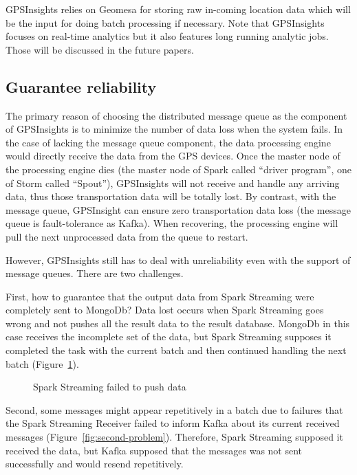 \documentclass{sig-alternate-05-2015}
\begin{document}
GPSInsights relies on Geomesa for storing raw in-coming location data which will be the input for doing batch processing if necessary. Note that GPSInsights focuses on real-time analytics but it also features long running analytic jobs. Those will be discussed in the future papers. 

\subsection{Guarantee reliability}

The primary reason of choosing the distributed message queue as the component of GPSInsights is to minimize the number of data loss when the system fails. In the case of lacking the message queue component, the data processing engine would directly receive the data from the GPS devices. Once the master node of the processing engine dies (the master node of Spark called ``driver program'', one of Storm called ``Spout''), GPSInsights will not receive and handle any arriving data, thus those transportation data will be totally lost. By contrast, with the message queue, GPSInsight can ensure zero transportation data loss (the message queue is fault-tolerance as Kafka). When recovering, the processing engine will pull the next unprocessed data from the queue to restart.

However, GPSInsights still has to deal with unreliability even with the support of message queues. There are two challenges. 

First, how to guarantee that the output data from Spark Streaming were completely sent to MongoDb? Data lost occurs when Spark Streaming goes wrong and not pushes all the result data to the result database. MongoDb in this case receives the incomplete set of the data, but Spark Streaming supposes it completed the task with the current batch and then continued handling the next batch (Figure~\ref{fig:first-problem}).

\begin{figure}[h]
\centering
{}
\caption{Spark Streaming failed to push data}
\label{fig:first-problem}
\end{figure} 

Second, some messages might appear repetitively in a batch due to failures that the Spark Streaming Receiver failed to inform Kafka about its current received messages (Figure~\ref{fig:second-problem}). Therefore, Spark Streaming supposed it received the data, but Kafka supposed that the messages was not sent successfully and would resend repetitively. 
 
\end{document}
